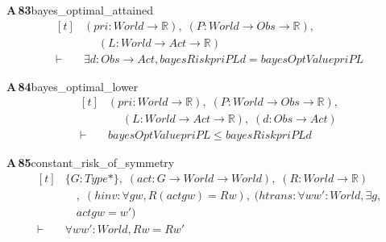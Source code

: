 \documentclass[conference]{IEEEtran}
\theoremstyle{definition}
\newcommand{\lean}[1]{\textsf{\footnotesize #1}}
\begin{document}
\noindent\textbf{A\,83}\quad\lean{bayes\_optimal\_attained}
{\footnotesize\[ \begin{aligned}[t]
&(\mathit{pri} : \mathit{World} \to \mathbb{R} ),\; (\mathit{P} : \mathit{World} \to \mathit{Obs} \to \mathbb{R} ),\\
&\quad \; (\mathit{L} : \mathit{World} \to \mathit{Act} \to \mathbb{R} )\\
\vdash\;&\exists \mathit{d} : \mathit{Obs} \to \mathit{Act}, \mathit{bayesRisk} \mathit{pri} \mathit{P} \mathit{L} \mathit{d} = \mathit{bayesOptValue} \mathit{pri} \mathit{P} \mathit{L}
\end{aligned} \]}

\noindent\textbf{A\,84}\quad\lean{bayes\_optimal\_lower}
{\footnotesize\[ \begin{aligned}[t]
&(\mathit{pri} : \mathit{World} \to \mathbb{R} ),\; (\mathit{P} : \mathit{World} \to \mathit{Obs} \to \mathbb{R} ),\\
&\quad \; (\mathit{L} : \mathit{World} \to \mathit{Act} \to \mathbb{R} ),\; (\mathit{d} : \mathit{Obs} \to \mathit{Act})\\
\vdash\;&\mathit{bayesOptValue} \mathit{pri} \mathit{P} \mathit{L} \leq \mathit{bayesRisk} \mathit{pri} \mathit{P} \mathit{L} \mathit{d}
\end{aligned} \]}

\noindent\textbf{A\,85}\quad\lean{constant\_risk\_of\_symmetry}
{\footnotesize\[ \begin{aligned}[t]
&\{ \mathit{G} : \mathit{Type}*\},\; (\mathit{act} : \mathit{G} \to \mathit{World} \to \mathit{World}),\; (\mathit{R} : \mathit{World} \to \mathbb{R} )\\
&\quad ,\; (\mathit{hinv} : \forall \mathit{g} \mathit{w}, \mathit{R} (\mathit{act} \mathit{g} \mathit{w}) = \mathit{R} \mathit{w}),\; (\mathit{htrans} : \forall \mathit{w} \mathit{w'} : \mathit{World}, \exists \mathit{g},\\
&\quad \mathit{act} \mathit{g} \mathit{w} = \mathit{w'})\\
\vdash\;&\forall \mathit{w} \mathit{w'} : \mathit{World}, \mathit{R} \mathit{w} = \mathit{R} \mathit{w'}
\end{aligned} \]}
\end{document}
